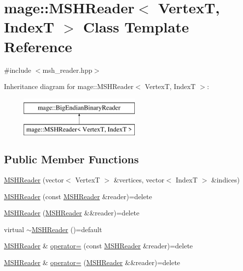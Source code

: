 \hypertarget{classmage_1_1_m_s_h_reader}{}\section{mage\+:\+:M\+S\+H\+Reader$<$ VertexT, IndexT $>$ Class Template Reference}
\label{classmage_1_1_m_s_h_reader}


{\ttfamily \#include $<$msh\+\_\+reader.\+hpp$>$}

Inheritance diagram for mage\+:\+:M\+S\+H\+Reader$<$ VertexT, IndexT $>$\+:\begin{figure}[H]
\begin{center}
\leavevmode
\includegraphics[height=2.000000cm]{classmage_1_1_m_s_h_reader}
\end{center}
\end{figure}
\subsection*{Public Member Functions}
\begin{DoxyCompactItemize}
\item 
\hyperlink{classmage_1_1_m_s_h_reader_af1254630a9770015c7b62d88eb5251bb}{M\+S\+H\+Reader} (vector$<$ VertexT $>$ \&vertices, vector$<$ IndexT $>$ \&indices)
\item 
\hyperlink{classmage_1_1_m_s_h_reader_aa33b8f059752b9aa321e8d227fe811bd}{M\+S\+H\+Reader} (const \hyperlink{classmage_1_1_m_s_h_reader}{M\+S\+H\+Reader} \&reader)=delete
\item 
\hyperlink{classmage_1_1_m_s_h_reader_a78e8751423b659aea0b2d91d281fa5fa}{M\+S\+H\+Reader} (\hyperlink{classmage_1_1_m_s_h_reader}{M\+S\+H\+Reader} \&\&reader)=delete
\item 
virtual \hyperlink{classmage_1_1_m_s_h_reader_aca7a192cd593d38167b5c284a0555932}{$\sim$\+M\+S\+H\+Reader} ()=default
\item 
\hyperlink{classmage_1_1_m_s_h_reader}{M\+S\+H\+Reader} \& \hyperlink{classmage_1_1_m_s_h_reader_abbe36c0fcfbf0c909a45f974c34ecc3a}{operator=} (const \hyperlink{classmage_1_1_m_s_h_reader}{M\+S\+H\+Reader} \&reader)=delete
\item 
\hyperlink{classmage_1_1_m_s_h_reader}{M\+S\+H\+Reader} \& \hyperlink{classmage_1_1_m_s_h_reader_a0f014d780eaa5477aa7206db51fede2f}{operator=} (\hyperlink{classmage_1_1_m_s_h_reader}{M\+S\+H\+Reader} \&\&reader)=delete
\end{DoxyCompactItemize}
